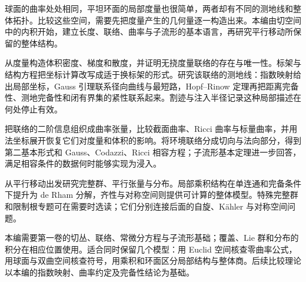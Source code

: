 
% 

\BookPartGuide
球面的曲率处处相同，平坦环面的局部度量也很简单，两者却有不同的测地线和整体拓扑。比较这些空间，需要先把度量产生的几何量逐一构造出来。本编由切空间中的内积开始，建立长度、联络、曲率与子流形的基本语言，再研究平行移动所保留的整体结构。

\ProseParagraphBreak
{}从度量构造体积密度、梯度和散度，并证明无挠度量联络的存在与唯一性。标架与结构方程把坐标计算改写成适于换标架的形式。研究该联络的测地线：指数映射给出局部坐标，Gauss 引理联系径向曲线与最短路，Hopf--Rinow 定理再把距离完备性、测地完备性和闭有界集的紧性联系起来。割迹与注入半径记录这种局部描述在何处停止有效。

\ProseParagraphBreak
{}把联络的二阶信息组织成曲率张量，比较截面曲率、Ricci 曲率与标量曲率，并用法坐标展开恢复它们对度量和体积的影响。将环境联络分成切向与法向部分，得到第二基本形式和 Gauss、Codazzi、Ricci 相容方程；子流形基本定理进一步回答，满足相容条件的数据何时能够实现为浸入。

\ProseParagraphBreak
{}从平行移动出发研究完整群、平行张量与分布。局部乘积结构在单连通和完备条件下提升为 de Rham 分解，齐性与对称空间则提供可计算的整体模型。特殊完整群和限制根专题可在需要时选读；它们分别连接后面的自旋、Kähler 与对称空间问题。

\ProseParagraphBreak
本编需要第一卷的切丛、联络、常微分方程与子流形基础；覆盖、Lie 群和分布的积分在相应位置使用。适合同时保留几个模型：用 Euclid 空间核查零曲率公式，用球面与双曲空间核查符号，用乘积和环面区分局部结构与整体商。后续比较理论以本编的指数映射、曲率约定及完备性结论为基础。







